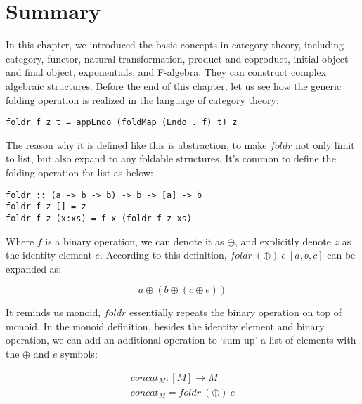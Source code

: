\documentclass{article}
\begin{document}
\begin{Exercise}
\end{Exercise}

\section{Summary}

In this chapter, we introduced the basic concepts in category theory, including category, functor, natural transformation, product and coproduct, initial object and final object, exponentials, and F-algebra. They can construct complex algebraic structures. Before the end of this chapter, let us see how the generic folding operation is realized in the language of category theory\cite{Haskell-foldable}:

\lstset{frame=single}
\begin{lstlisting}
foldr f z t = appEndo (foldMap (Endo . f) t) z
\end{lstlisting}

The reason why it is defined like this is abstraction, to make $foldr$ not only limit to list, but also expand to any foldable structures. It's common to define the folding operation for list as below:

\begin{lstlisting}
foldr :: (a -> b -> b) -> b -> [a] -> b
foldr f z [] = z
foldr f z (x:xs) = f x (foldr f z xs)
\end{lstlisting}

Where $f$ is a binary operation, we can denote it as $\oplus$, and explicitly denote $z$ as the identity element $e$. According to this definition, $foldr\ (\oplus)\ e\ [a, b, c]$ can be expanded as:

\[
a \oplus (b \oplus (c \oplus e))
\]

It reminds us monoid, $foldr$ essentially repeats the binary operation on top of monoid. In the monoid definition, besides the identity element and binary operation, we can add an additional operation to `sum up' a list of elements with the $\oplus$ and $e$ symbols:

\[
\begin{array}{l}
concat_M : [M] \to M \\
concat_M = foldr\ (\oplus)\ e \\
\end{array}
\]
\end{document}
